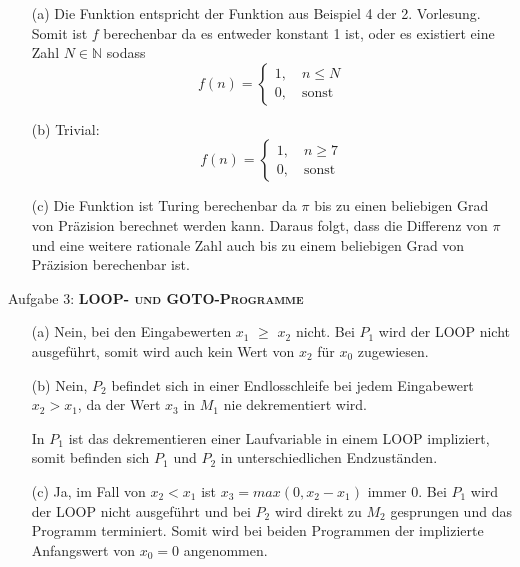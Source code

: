 \documentclass[a4paper,onecolumn,oneside,12pt,ngerman]{article}
\theoremstyle{plain} %
\theoremstyle{definition} %
\theoremstyle{remark} %
\theoremstyle{plain}
\newcommand{\NN}{\mathbb{N}} %
\begin{document}
\begin{enumerate}
  \item[(a)] Die Funktion entspricht der Funktion aus Beispiel 4 der 2. Vorlesung.
  Somit ist $f$ berechenbar da es entweder konstant 1 ist, oder es existiert eine Zahl 
  $N \in \NN$ sodass
  \[f(n) = \begin{cases} 1, \quad n\leq N \\ 0, \quad \text{sonst} \end{cases}\]
  \item[(b)] Trivial:
  \[f(n) = \begin{cases}
    1, \quad n\geq 7 \\
    0, \quad \text{sonst}
  \end{cases}\]
  \item[(c)] Die Funktion ist Turing berechenbar da $\pi$ bis zu einen beliebigen Grad
  von Präzision berechnet werden kann. Daraus folgt, dass die Differenz von $\pi$ und eine 
  weitere rationale Zahl auch bis zu einem beliebigen Grad von Präzision berechenbar ist. 
\end{enumerate}

\newpage
Aufgabe 3: \quad \textsc{\textbf{LOOP- und GOTO-Programme}}

\begin{enumerate}
     \item[(a)] Nein, bei den Eingabewerten $x_1$ $\geq$ $x_2$ nicht. 
     Bei $P_1$ wird der LOOP nicht ausgeführt, somit wird auch kein Wert von $x_2$ für $x_0$ zugewiesen.
     
     \item[(b)] Nein, $P_2$ befindet sich in einer Endlosschleife bei jedem Eingabewert $x_2 > x_1$, da der Wert $x_3$ in $M_1$ nie dekrementiert wird. 

    In $P_1$ ist das dekrementieren einer Laufvariable in einem LOOP impliziert, somit befinden sich $P_1$ und $P_2$ in unterschiedlichen Endzuständen.

    \item[(c)] Ja, im Fall von $x_2 < x_1$ ist $x_3 = max(0, x_2 - x_1)$ immer $0$. Bei $P_1$ wird der LOOP nicht ausgeführt und bei $P_2$ wird direkt zu $M_2$ gesprungen und das Programm terminiert. Somit wird bei beiden Programmen der implizierte Anfangswert von $x_0 = 0$ angenommen. 

\end{enumerate}
\end{document}
